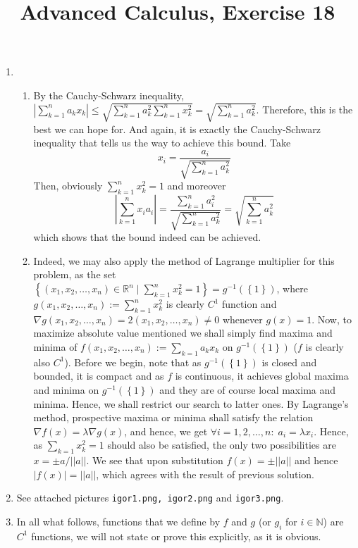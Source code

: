 \documentclass[8pt]{article} %
\title{Advanced Calculus, Exercise 18}
\newcommand{\mynorm}[1]{\left|\left|#1\right|\right|}
\newcommand{\myabs}[1]{\left|#1\right|}
\newcommand{\myset}[1]{\left\{#1\right\}}
\begin{document}
\maketitle
\begin{enumerate}
\item{
\begin{enumerate}[label=(\alph*)]
	\item{By the Cauchy-Schwarz inequality, $\myabs{\sum_{k=1}^n a_kx_k }\leq \sqrt{\sum_{k=1}^n a_k^2\sum_{k=1}^n x_k^2}=\sqrt{\sum_{k=1}^n a_k^2}$.
		Therefore, this is the best
		we can hope for. And again, it is exactly the Cauchy-Schwarz inequality that tells us the way to achieve this bound. Take 
		\[x_i=\frac{a_i}{\sqrt{\sum_{k=1}^n a_k^2}}\]
		Then, obviously $\sum_{k=1}^n x_k^2=1$ and moreover
		\[\myabs{\sum_{k=1}^n x_ia_i}=\frac{\sum_{k=1}^n a_i^2}{\sqrt{\sum_{k=1}^n a_k^2}}={\sqrt{\sum_{k=1}^n a_k^2}}\]
		which shows that the bound indeed can be achieved.
		}
	\item{Indeed, we may also apply the method of Lagrange multiplier for this problem, as the set $\left\{(x_1,x_2,\dots,x_n)\in\mathbb{R}^n\mid\sum_{k=1}^n x_k^2=1\right\}=
		g^{-1}(\myset{1})$, where $g(x_1,x_2,\dots,x_n):=\sum_{k=1}^n x_k^2$ is clearly $C^1$ function and $\nabla g(x_1,x_2,\dots,x_n)=2(x_1,x_2,\dots,x_n)\neq 0$
		whenever $g(x)=1$. Now, to maximize absolute value mentioned we shall simply find maxima and minima of $f(x_1,x_2,\dots,x_n):=\sum_{k=1}a_kx_k$ on $g^{-1}(\myset{1})$
		($f$ is clearly also $C^1$). Before we begin, note that as $g^{-1}(\myset{1})$ is closed and bounded, it is compact and as $f$ is continuous, it achieves global
		maxima and minima on $g^{-1}(\myset{1})$ and they are of course local maxima and minima. Hence, we shall restrict our search to latter ones.
		By Lagrange's method, prospective maxima or minima shall satisfy the relation $\nabla f(x)=\lambda\nabla g(x)$, and hence,
		we get $\forall i=1,2,\dots,n:\; a_i=\lambda x_i$. Hence, as $\sum_{k=1} x_k^2=1$ should also be satisfied,
		the only two possibilities are $x=\pm a/\mynorm{a}$. We see that upon substitution $f(x)=\pm \mynorm{a}$ and hence $|f(x)|=
		\mynorm{a}$, which agrees with the result
		of previous solution.}
\end{enumerate}
}
\item{See attached pictures \texttt{igor1.png, igor2.png} and \texttt{igor3.png}. 
	}
\item{In all what follows, functions that we define by $f$ and $g$ (or $g_i$ for $i\in\mathbb{N}$)
	are $C^1$ functions, we will not state or prove this explicitly, as it is obvious.
}
\end{enumerate}
\end{document}
